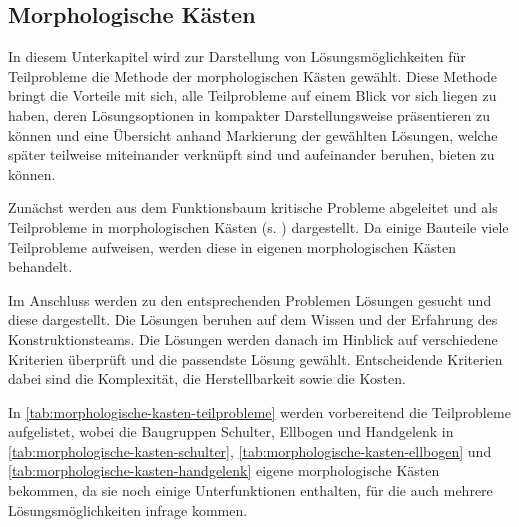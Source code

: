 		\subsection{Morphologische Kästen}
			In diesem Unterkapitel wird zur Darstellung von Lösungsmöglichkeiten für Teilprobleme die Methode der morphologischen Kästen gewählt. Diese Methode bringt die Vorteile mit sich, alle Teilprobleme auf einem Blick vor sich liegen zu haben, deren Lösungsoptionen in kompakter Darstellungsweise präsentieren zu können und eine Übersicht anhand Markierung der gewählten Lösungen, welche später teilweise miteinander verknüpft sind und aufeinander beruhen, bieten zu können.\par\medskip
			Zunächst werden aus dem Funktionsbaum kritische Probleme abgeleitet und als Teilprobleme in morphologischen Kästen (s. ) dargestellt. Da einige Bauteile viele Teilprobleme aufweisen, werden diese in eigenen morphologischen Kästen behandelt.\par
			Im Anschluss werden zu den entsprechenden Problemen Lösungen gesucht und diese dargestellt. Die Lösungen beruhen auf dem Wissen und der Erfahrung des Konstruktionsteams. Die Lösungen werden danach im Hinblick auf verschiedene Kriterien überprüft und die passendste Lösung gewählt. Entscheidende Kriterien dabei sind die Komplexität, die Herstellbarkeit sowie die Kosten.\par\medskip
			In \cref{tab:morphologische-kasten-teilprobleme} werden vorbereitend die Teilprobleme aufgelistet, wobei die Baugruppen Schulter, Ellbogen und Handgelenk in \cref{tab:morphologische-kasten-schulter}, \cref{tab:morphologische-kasten-ellbogen} und \cref{tab:morphologische-kasten-handgelenk} eigene morphologische Kästen bekommen, da sie noch einige Unterfunktionen enthalten, für die auch mehrere Lösungsmöglichkeiten infrage kommen. 

